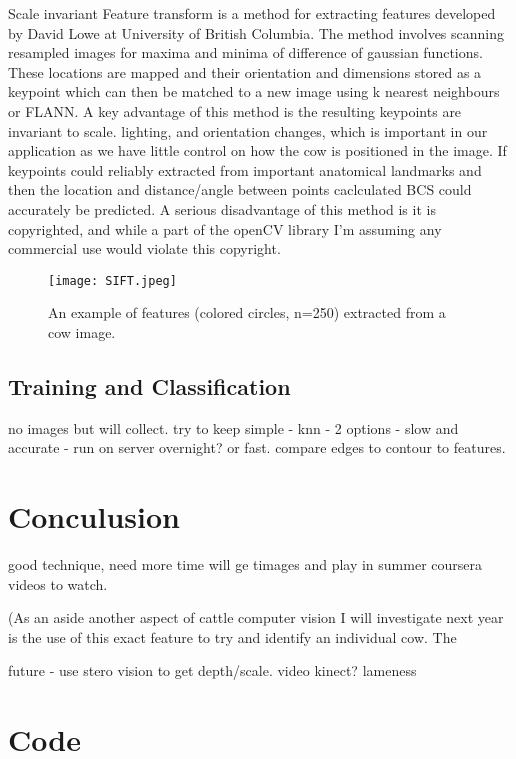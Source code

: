 \documentclass[11pt]{article}
\begin{document}
	
	Scale invariant Feature transform is a method for extracting features developed by David Lowe at University of British Columbia\cite{Lowe2004a}.
	The method involves scanning resampled images for maxima and minima of difference of gaussian functions.
	These locations are mapped and their orientation and dimensions stored as a keypoint which can then be matched to a new image using k nearest neighbours or FLANN. 
	A key advantage of this method is the resulting keypoints are invariant to scale. lighting, and orientation changes, which is important in our application as we have little control on how the cow is positioned in the image.
	If keypoints could reliably extracted from important anatomical landmarks and then the location and distance/angle between points caclculated BCS could accurately be predicted.
	A serious disadvantage of this method is it is copyrighted, and while a part of the openCV library I'm assuming any commercial use would violate this copyright.

	\begin{figure}[h!]
		\centering
		\texttt{[image: SIFT.jpeg]}
		\caption{An example of features (colored circles, n=250) extracted from a cow image.}
	\end{figure}


\subsection{Training and Classification}

	no images but will collect. 
	try to keep simple - knn -  2 options - slow and accurate - run on server overnight? or fast.
	compare edges to contour to features.

\section{Conculusion}
	good technique, need more time
	will ge timages and play in summer
	coursera videos to watch.

	(As an aside another aspect of cattle computer vision I will investigate next year is the use of this exact feature to try and identify an individual cow. The 

	future - use stero vision to get depth/scale.
		video
		kinect?
		lameness

\section{Code}
	



\end{document}
